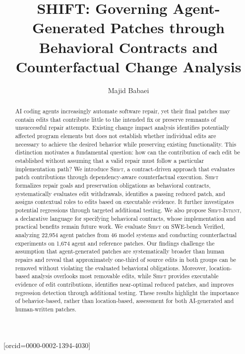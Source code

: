 \documentclass[a4paper,fleqn]{cas-sc}
\newcommand{\tool}{\textsc{Shift}}
\newcommand{\dsl}{\textsc{Shift-Intent}}
\begin{document}
\let\WriteBookmarks\relax
{}
\title[mode=title]{SHIFT: Governing Agent-Generated Patches through Behavioral Contracts and Counterfactual Change Analysis}
\author[1]{Majid Babaei}[orcid=0000-0002-1394-4030]
\cormark[1]

\begin{abstract}
AI coding agents increasingly automate software repair, yet their final patches may contain edits that contribute little to the intended fix or preserve remnants of unsuccessful repair attempts. Existing change impact analysis identifies potentially affected program elements but does not establish whether individual edits are necessary to achieve the desired behavior while preserving existing functionality. This distinction motivates a fundamental question: how can the contribution of each edit be established without assuming that a valid repair must follow a particular implementation path? We introduce \tool{}, a contract-driven approach that evaluates patch contributions through dependency-aware counterfactual execution. \tool{} formalizes repair goals and preservation obligations as behavioral contracts, systematically evaluates edit withdrawals, identifies a passing reduced patch, and assigns contextual roles to edits based on executable evidence. It further investigates potential regressions through targeted additional testing. We also propose \dsl{}, a declarative language for specifying behavioral contracts, whose implementation and practical benefits remain future work. We evaluate \tool{} on SWE-bench Verified, analyzing 22,954 agent patches from 46 model systems and conducting counterfactual experiments on 1,674 agent and reference patches. Our findings challenge the assumption that agent-generated patches are systematically broader than human repairs and reveal that approximately one-third of source edits in both groups can be removed without violating the evaluated behavioral obligations. Moreover, location-based analysis overlooks most removable edits, while \tool{} provides executable evidence of edit contributions, identifies near-optimal reduced patches, and improves regression detection through additional testing. These results highlight the importance of behavior-based, rather than location-based, assessment for both AI-generated and human-written patches.




\end{abstract}
\end{document}
